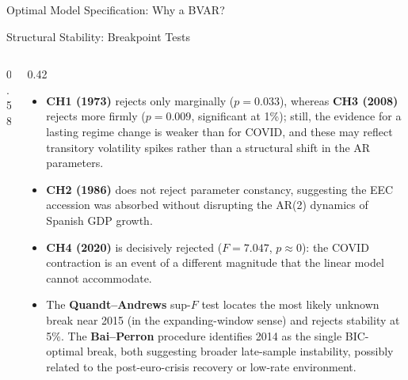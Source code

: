 \documentclass[9pt]{beamer}
\begin{document}
\begin{frame}{Optimal Model Specification: Why a BVAR?}
\end{frame}


\begin{frame}{Structural Stability: Breakpoint Tests}
\label{slide:breaks}
\footnotesize

\begin{columns}
  \begin{column}{0.58\textwidth}
    {\fontsize{5.5}{6}\selectfont
    \setlength{\tabcolsep}{2.5pt}
    \setlength{\abovecaptionskip}{2pt}
    \setlength{\belowcaptionskip}{1pt}
    
    \vspace{0.1cm}
    
    }
  \end{column}

  \begin{column}{0.42\textwidth}
    \scriptsize
    \begin{itemize}
      \item \textbf{CH1 (1973)} rejects only marginally ($p=0.033$), whereas \textbf{CH3 (2008)} rejects more firmly ($p=0.009$, significant at 1\%); still, the evidence for a lasting regime change is weaker than for COVID, and these may reflect transitory volatility spikes rather than a structural shift in the AR parameters.
      \item \textbf{CH2 (1986)} does not reject parameter constancy, suggesting the EEC accession was absorbed without disrupting the AR(2) dynamics of Spanish GDP growth.
      \item \textbf{CH4 (2020)} is decisively rejected ($F=7.047$, $p\approx 0$): the COVID contraction is an event of a different magnitude that the linear model cannot accommodate.
      \item The \textbf{Quandt--Andrews} sup-$F$ test locates the most likely unknown break near 2015 (in the expanding-window sense) and rejects stability at 5\%. The \textbf{Bai--Perron} procedure identifies 2014 as the single BIC-optimal break, both suggesting broader late-sample instability, possibly related to the post-euro-crisis recovery or low-rate environment.
    \end{itemize}
  \end{column}
\end{columns}

\end{frame}
\end{document}
